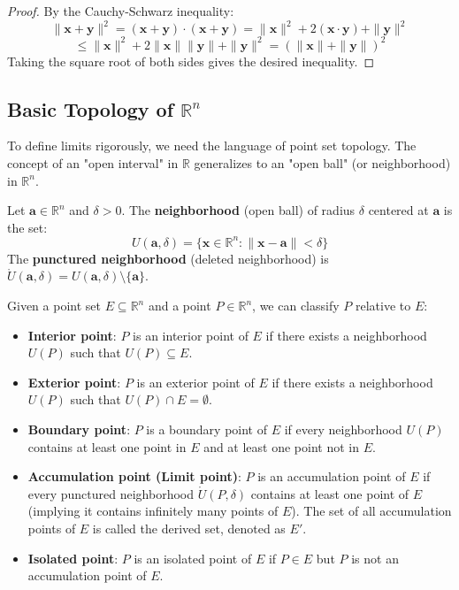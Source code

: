 \begin{proof}
By the Cauchy-Schwarz inequality:
\[ \|\mathbf{x} + \mathbf{y}\|^2 = (\mathbf{x} + \mathbf{y}) \cdot (\mathbf{x} + \mathbf{y}) = \|\mathbf{x}\|^2 + 2(\mathbf{x} \cdot \mathbf{y}) + \|\mathbf{y}\|^2 \]
\[ \le \|\mathbf{x}\|^2 + 2\|\mathbf{x}\| \|\mathbf{y}\| + \|\mathbf{y}\|^2 = (\|\mathbf{x}\| + \|\mathbf{y}\|)^2 \]
Taking the square root of both sides gives the desired inequality.
\end{proof}

\subsection{Basic Topology of $\mathbb{R}^n$}

To define limits rigorously, we need the language of point set topology. The concept of an "open interval" in $\mathbb{R}$ generalizes to an "open ball" (or neighborhood) in $\mathbb{R}^n$.

\begin{definition}
Let $\mathbf{a} \in \mathbb{R}^n$ and $\delta > 0$. The \textbf{neighborhood} (open ball) of radius $\delta$ centered at $\mathbf{a}$ is the set:
\[ U(\mathbf{a}, \delta) = \{ \mathbf{x} \in \mathbb{R}^n : \|\mathbf{x} - \mathbf{a}\| < \delta \} \]
The \textbf{punctured neighborhood} (deleted neighborhood) is $\mathring{U}(\mathbf{a}, \delta) = U(\mathbf{a}, \delta) \setminus \{\mathbf{a}\}$.
\end{definition}

Given a point set $E \subseteq \mathbb{R}^n$ and a point $P \in \mathbb{R}^n$, we can classify $P$ relative to $E$:
\begin{itemize}
    \item \textbf{Interior point}: $P$ is an interior point of $E$ if there exists a neighborhood $U(P)$ such that $U(P) \subseteq E$.
    \item \textbf{Exterior point}: $P$ is an exterior point of $E$ if there exists a neighborhood $U(P)$ such that $U(P) \cap E = \emptyset$.
    \item \textbf{Boundary point}: $P$ is a boundary point of $E$ if every neighborhood $U(P)$ contains at least one point in $E$ and at least one point not in $E$.
    \item \textbf{Accumulation point (Limit point)}: $P$ is an accumulation point of $E$ if every punctured neighborhood $\mathring{U}(P, \delta)$ contains at least one point of $E$ (implying it contains infinitely many points of $E$). The set of all accumulation points of $E$ is called the derived set, denoted as $E'$.
    \item \textbf{Isolated point}: $P$ is an isolated point of $E$ if $P \in E$ but $P$ is not an accumulation point of $E$.
\end{itemize}

